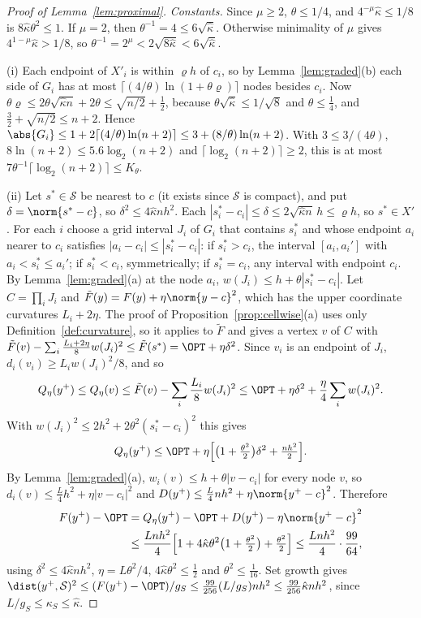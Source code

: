 \begin{proof}[Proof of Lemma~\ref{lem:proximal}]
\emph{Constants.} Since $\mu\ge2$, $\theta\le1/4$, and
$4^{-\mu}\hat\kappa\le1/8$ is $8\hat\kappa\theta^2\le1$. If $\mu=2$, then
$\theta^{-1}=4\le6\sqrt{\hat\kappa}$. Otherwise minimality of $\mu$ gives
$4^{1-\mu}\hat\kappa>1/8$, so $\theta^{-1}=2^\mu<2\sqrt{8\hat\kappa}
<6\sqrt{\hat\kappa}$.

(i) Each endpoint of $X'_i$ is within $\varrho h$ of $c_i$, so by
Lemma~\ref{lem:graded}(b) each side of $G_i$ has at most
$\lceil(4/\theta)\ln(1+\theta\varrho)\rceil$ nodes besides $c_i$. Now
$\theta\varrho\le2\theta\sqrt{\hat\kappa n}+2\theta\le\sqrt{n/2}+\frac12$,
because $\theta\sqrt{\hat\kappa}\le1/\sqrt8$ and $\theta\le\frac14$, and
$\frac32+\sqrt{n/2}\le n+2$. Hence
$\abs{G_i}\le1+2\lceil(4/\theta)\ln(n+2)\rceil\le3+(8/\theta)\ln(n+2)$. With
$3\le3/(4\theta)$, $8\ln(n+2)\le5.6\log_2(n+2)$ and
$\lceil\log_2(n+2)\rceil\ge2$, this is at most
$7\theta^{-1}\lceil\log_2(n+2)\rceil\le K_\theta$.

(ii) Let $s^*\in\mathcal S$ be nearest to $c$ (it exists since $\mathcal S$
is compact), and put $\delta=\norm{s^*-c}$, so $\delta^2\le4\hat\kappa nh^2$. Each
$|s^*_i-c_i|\le\delta\le2\sqrt{\hat\kappa n}\,h\le\varrho h$, so $s^*\in X'$.
For each $i$ choose a grid interval $J_i$ of $G_i$ that contains $s_i^*$ and
whose endpoint $a_i$ nearer to $c_i$ satisfies $|a_i-c_i|\le|s_i^*-c_i|$:
if $s_i^*>c_i$, the interval $[a_i,a_i']$ with $a_i<s_i^*\le a_i'$; if
$s_i^*<c_i$, symmetrically; if $s_i^*=c_i$, any interval with endpoint
$c_i$. By Lemma~\ref{lem:graded}(a) at the node $a_i$,
$w(J_i)\le h+\theta|s_i^*-c_i|$. Let $C=\prod_iJ_i$ and
$\tilde F(y)=F(y)+\eta\norm{y-c}^2$, which has the upper coordinate
curvatures $L_i+2\eta$. The proof of Proposition~\ref{prop:cellwise}(a) uses
only Definition~\ref{def:curvature}, so it applies to $\tilde F$ and gives a
vertex $v$ of $C$ with
$\tilde F(v)-\sum_i\frac{L_i+2\eta}8w(J_i)^2\le\tilde F(s^*)=\OPT+\eta\delta^2$.
Since $v_i$ is an endpoint of $J_i$, $d_i(v_i)\ge L_iw(J_i)^2/8$, and so
\[
Q_\eta(y^+)\le Q_\eta(v)\le\tilde F(v)-\sum_i\frac{L_i}8w(J_i)^2
\le\OPT+\eta\delta^2+\frac\eta4\sum_iw(J_i)^2 .
\]
With $w(J_i)^2\le2h^2+2\theta^2(s_i^*-c_i)^2$ this gives
\[
Q_\eta(y^+)\le\OPT+\eta\Bigl[\bigl(1+\tfrac{\theta^2}2\bigr)\delta^2
+\tfrac{nh^2}2\Bigr].
\]
By Lemma~\ref{lem:graded}(a), $w_i(v)\le h+\theta|v-c_i|$ for every node $v$,
so $d_i(v)\le\frac L4h^2+\eta|v-c_i|^2$ and
$D(y^+)\le\frac L4nh^2+\eta\norm{y^+-c}^2$. Therefore
\begin{align*}
F(y^+)-\OPT&=Q_\eta(y^+)-\OPT+D(y^+)-\eta\norm{y^+-c}^2\\
&\le\frac{Lnh^2}4\Bigl[1+4\hat\kappa\theta^2\bigl(1+\tfrac{\theta^2}2\bigr)
+\tfrac{\theta^2}2\Bigr]\le\frac{Lnh^2}4\cdot\frac{99}{64},
\end{align*}
using $\delta^2\le4\hat\kappa nh^2$, $\eta=L\theta^2/4$,
$4\hat\kappa\theta^2\le\frac12$ and $\theta^2\le\frac1{16}$. Set growth gives
$\dist(y^+,\mathcal S)^2\le(F(y^+)-\OPT)/g_S\le\frac{99}{256}(L/g_S)nh^2\le
\frac{99}{256}\hat\kappa nh^2$, since $L/g_S\le\kappa_S\le\hat\kappa$.


\end{proof}
